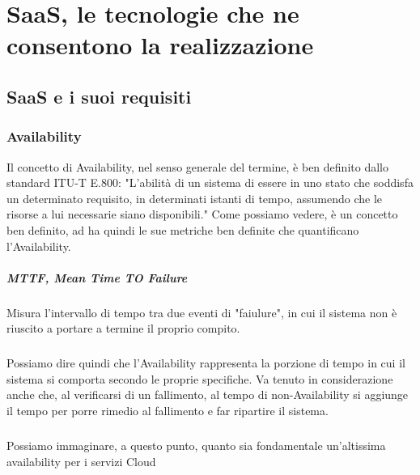 \chapter{SaaS, le tecnologie che ne consentono la realizzazione}

\section{SaaS e i suoi requisiti}

\subsection{Availability}
Il concetto di Availability, nel senso generale del termine, è ben definito dallo standard ITU-T E.800: "L'abilità di un sistema di essere in uno stato che soddisfa un determinato requisito, in determinati istanti di tempo, assumendo che le risorse a lui necessarie siano disponibili." Come possiamo vedere, è un concetto ben definito, ad ha quindi le sue metriche ben definite che quantificano l'Availability. 

\paragraph{MTTF, Mean Time TO Failure}
Misura l'intervallo di tempo tra due eventi di "faiulure", in cui il sistema non è riuscito a portare a termine il proprio compito.

\paragraph{}
Possiamo dire quindi che l'Availability rappresenta la porzione di tempo in cui il sistema si comporta secondo le proprie specifiche. Va tenuto in considerazione anche che, al verificarsi di un fallimento, al tempo di non-Availability si aggiunge il tempo per porre rimedio al fallimento e far ripartire il sistema. 

\paragraph{}
Possiamo immaginare, a questo punto, quanto sia fondamentale un'altissima availability per i servizi Cloud 

